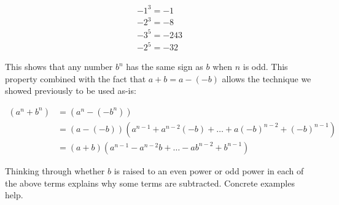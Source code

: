 \documentclass{standalone}
\begin{document}
\begin{gather*}
  -1^3 = -1 \\
  -2^3 = -8 \\
  -3^5 = -243 \\
  -2^5 = -32
\end{gather*}

This shows that any number $b^n$ has the same sign as $b$ when $n$ is odd. This
property combined with the fact that $a + b = a - (-b)$ allows the technique we
showed previously to be used as-is:

\begin{align*}
  (a^n + b^n)
  &= (a^n - (-b^n)) \\
  &= (a - (-b))(a^{n-1} + a^{n-2}(-b) + \dots + a(-b)^{n-2} + (-b)^{n-1}) \\
  &= (a + b)(a^{n-1} - a^{n-2}b + \dots - ab^{n-2} + b^{n-1})
\end{align*}

Thinking through whether $b$ is raised to an even power or odd power in each of
the above terms explains why some terms are subtracted. Concrete examples help.
\end{document}
